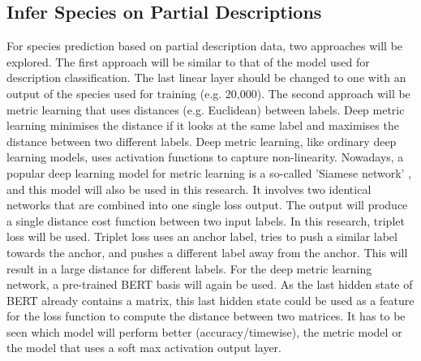 \documentclass{article}
\begin{document}
\subsection{Infer Species on Partial Descriptions}
For species prediction based on partial description data, two approaches will be explored.
The first approach will be similar to that of the model used for description classification.
The last linear layer should be changed to one with an output of the species used for training (e.g. 20,000).
The second approach will be metric learning that uses distances (e.g. Euclidean) between labels.
Deep metric learning minimises the distance if it looks at the same label and maximises the distance between two different labels.
Deep metric learning, like ordinary deep learning models, uses activation functions to capture non-linearity.
Nowadays, a popular deep learning model for metric learning is a so-called 'Siamese network' \autocite{kaya_deep_2019}, and this model will also be used in this research.
It involves two identical networks that are combined into one single loss output.
The output will produce a single distance cost function between two input labels.
In this research, triplet loss \autocite{schroff_facenet_2015} will be used.
Triplet loss uses an anchor label, tries to push a similar label towards the anchor, and pushes a different label away from the anchor.
This will result in a large distance for different labels.
For the deep metric learning network, a pre-trained BERT basis will again be used.
As the last hidden state of BERT already contains a matrix, this last hidden state could be used as a feature for the loss function to compute the distance between two matrices.
It has to be seen which model will perform better (accuracy/timewise), the metric model or the model that uses a soft max activation output layer. 
\end{document}
